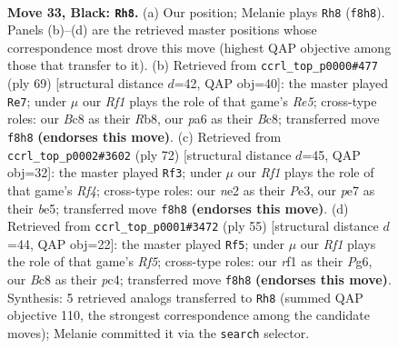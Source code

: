 \documentclass[11pt]{article}
\begin{document}
\clearpage

\begin{figure}[p]\centering
\begin{subfigure}{0.46\textwidth}\centering
\resizebox{\linewidth}{!}{%
\newchessgame
\chessboard[
  setfen={2b2r2/p3P3/Pr1p1p1k/2pB4/2P5/6P1/4N2K/R4R2 b - - 0 33},
  showmover=false,
  pgfstyle=straightmove, color=movearrow, markmove={f8-h8}
]}
\caption{}
\end{subfigure}\hfill
\begin{subfigure}{0.46\textwidth}\centering
\resizebox{\linewidth}{!}{%
\newchessgame
\chessboard[
  setfen={1rb4k/p6p/1p1p1R2/2pP4/2P1r3/P4B2/6PR/6K1 b - - 1 35},
  showmover=false,
  pgfstyle=straightmove, color=movearrow, markmove={e4-e7}
]}
\caption{}
\end{subfigure}
\\[4pt]
\begin{subfigure}{0.46\textwidth}\centering
\resizebox{\linewidth}{!}{%
\newchessgame
\chessboard[
  setfen={8/1p2k1p1/2p1p3/4b1P1/2P1BR2/4P3/1r1r1PK1/5R2 w - - 4 37},
  showmover=false,
  pgfstyle=straightmove, color=movearrow, markmove={f4-f3}
]}
\caption{}
\end{subfigure}\hfill
\begin{subfigure}{0.46\textwidth}\centering
\resizebox{\linewidth}{!}{%
\newchessgame
\chessboard[
  setfen={6k1/2rp3p/2b1p1p1/8/2P2r2/6PP/3R1P2/3R1BK1 b - - 0 28},
  showmover=false,
  pgfstyle=straightmove, color=movearrow, markmove={f4-f5}
]}
\caption{}
\end{subfigure}
\caption{\textbf{Move 33, Black: \texttt{Rh8}.} (a) Our position; Melanie plays \texttt{Rh8} (\texttt{f8h8}). Panels (b)--(d) are the retrieved master positions whose correspondence most drove this move (highest QAP objective among those that transfer to it). (b) Retrieved from \texttt{ccrl\_top\_p0000\#477} (ply 69) [structural distance $d$=42, QAP obj=40]: the master played \texttt{Re7}; under $\mu$ our \emph{Rf1} plays the role of that game's \emph{Re5}; cross-type roles: our \emph{B}c8 as their \emph{R}b8, our \emph{p}a6 as their \emph{B}c8; transferred move \texttt{f8h8} \textbf{(endorses this move)}. (c) Retrieved from \texttt{ccrl\_top\_p0002\#3602} (ply 72) [structural distance $d$=45, QAP obj=32]: the master played \texttt{Rf3}; under $\mu$ our \emph{Rf1} plays the role of that game's \emph{Rf4}; cross-type roles: our \emph{n}e2 as their \emph{P}e3, our \emph{p}e7 as their \emph{b}e5; transferred move \texttt{f8h8} \textbf{(endorses this move)}. (d) Retrieved from \texttt{ccrl\_top\_p0001\#3472} (ply 55) [structural distance $d$=44, QAP obj=22]: the master played \texttt{Rf5}; under $\mu$ our \emph{Rf1} plays the role of that game's \emph{Rf5}; cross-type roles: our \emph{r}f1 as their \emph{P}g6, our \emph{B}c8 as their \emph{p}c4; transferred move \texttt{f8h8} \textbf{(endorses this move)}. Synthesis: 5 retrieved analogs transferred to \texttt{Rh8} (summed QAP objective 110, the strongest correspondence among the candidate moves); Melanie committed it via the \texttt{search} selector.}
\label{fig:thought-m65}
\end{figure}
\end{document}
